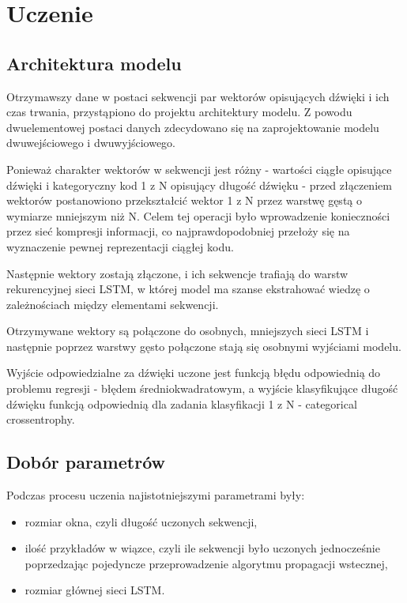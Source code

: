 \chapter{Uczenie} 
{
    \section{Architektura modelu}
    {
        Otrzymawszy dane w postaci sekwencji par wektorów opisujących dźwięki i ich czas trwania,
        przystąpiono do projektu architektury modelu. Z powodu dwuelementowej postaci danych
        zdecydowano się na zaprojektowanie modelu dwuwejściowego i dwuwyjściowego.

        Ponieważ charakter wektorów w sekwencji jest różny - wartości ciągłe opisujące dźwięki i 
        kategoryczny kod 1 z N opisujący długość dźwięku - przed złączeniem wektorów postanowiono 
        przekształcić wektor 1 z N przez warstwę gęstą o wymiarze mniejszym niż N. Celem tej operacji
        było wprowadzenie konieczności przez sieć kompresji informacji, co najprawdopodobniej przełoży się 
        na wyznaczenie pewnej reprezentacji ciągłej kodu. 

        Następnie wektory zostają złączone, i ich sekwencje trafiają do warstw rekurencyjnej sieci LSTM,
        w której model ma szanse ekstrahować wiedzę o zależnościach między elementami sekwencji.

        Otrzymywane wektory są połączone do osobnych, mniejszych sieci LSTM i następnie poprzez warstwy 
        gęsto połączone stają się osobnymi wyjściami modelu.
        
        Wyjście odpowiedzialne za dźwięki uczone jest funkcją błędu odpowiednią do problemu 
        regresji - błędem średniokwadratowym, a wyjście klasyfikujące długość dźwięku funkcją odpowiednią
        dla zadania klasyfikacji 1 z N - categorical crossentrophy.
    }

    \section{Dobór parametrów}
    {
        Podczas procesu uczenia najistotniejszymi parametrami były:
        \begin{itemize}
            \item rozmiar okna, czyli długość uczonych sekwencji,
            \item ilość przykładów w wiązce, czyli ile sekwencji było uczonych jednocześnie
            poprzedzając pojedyncze przeprowadzenie algorytmu propagacji wstecznej,
            \item rozmiar głównej sieci LSTM.
        \end{itemize}
    }

}
